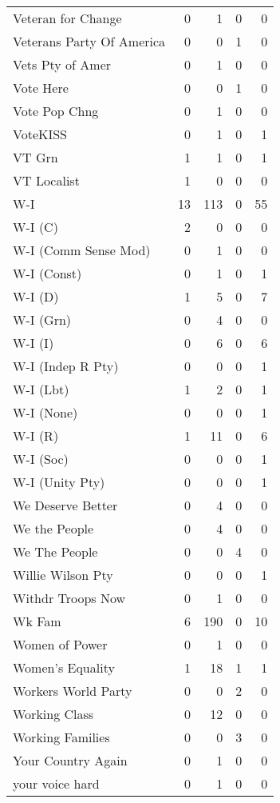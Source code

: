 \begin{supertabular}{lrrrr}
Veteran for Change & 0 & 1 & 0 & 0\\
Veterans Party Of America & 0 & 0 & 1 & 0\\
Vets Pty of Amer & 0 & 1 & 0 & 0\\
Vote Here & 0 & 0 & 1 & 0\\
Vote Pop Chng & 0 & 1 & 0 & 0\\
VoteKISS & 0 & 1 & 0 & 1\\
VT Grn & 1 & 1 & 0 & 1\\
VT Localist & 1 & 0 & 0 & 0\\
W-I & 13 & 113 & 0 & 55\\
W-I (C) & 2 & 0 & 0 & 0\\
W-I (Comm Sense Mod) & 0 & 1 & 0 & 0\\
W-I (Const) & 0 & 1 & 0 & 1\\
W-I (D) & 1 & 5 & 0 & 7\\
W-I (Grn) & 0 & 4 & 0 & 0\\
W-I (I) & 0 & 6 & 0 & 6\\
W-I (Indep R Pty) & 0 & 0 & 0 & 1\\
W-I (Lbt) & 1 & 2 & 0 & 1\\
W-I (None) & 0 & 0 & 0 & 1\\
W-I (R) & 1 & 11 & 0 & 6\\
W-I (Soc) & 0 & 0 & 0 & 1\\
W-I (Unity Pty) & 0 & 0 & 0 & 1\\
We Deserve Better & 0 & 4 & 0 & 0\\
We the People & 0 & 4 & 0 & 0\\
We The People & 0 & 0 & 4 & 0\\
Willie Wilson Pty & 0 & 0 & 0 & 1\\
Withdr Troops Now & 0 & 1 & 0 & 0\\
Wk Fam & 6 & 190 & 0 & 10\\
Women of Power & 0 & 1 & 0 & 0\\
Women's Equality & 1 & 18 & 1 & 1\\
Workers World Party & 0 & 0 & 2 & 0\\
Working Class & 0 & 12 & 0 & 0\\
Working Families & 0 & 0 & 3 & 0\\
Your Country Again & 0 & 1 & 0 & 0\\
your voice hard & 0 & 1 & 0 & 0\\
\bottomrule
\end{supertabular}
